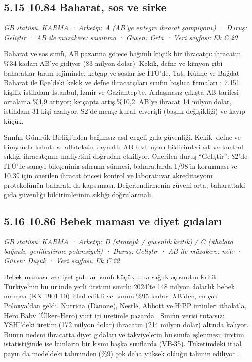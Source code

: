 \hypertarget{nace_kartlar_10-12-515-1084-baharat-sos-ve-sirke}{%
\subsection{5.15 10.84 Baharat, sos ve sirke}\label{nace_kartlar_10-12-515-1084-baharat-sos-ve-sirke}}

\emph{GB statüsü: KARMA · Arketip: A (AB'ye entegre ihracat şampiyonu) · Duruş: Geliştir · AB ile müzakere: savunma · Güven: Orta · Veri sayfası: Ek C.20}

Baharat ve sos sınıfı, AB pazarına görece bağımlı küçük bir ihracatçı: ihracatın \%34 kadarı AB'ye gidiyor (83 milyon dolar). Kekik, defne ve kimyon gibi baharatlar tarım rejiminde, ketçap ve soslar ise İTÜ'de. Tat, Kühne ve Bağdat Baharat ile Ege'deki kekik ve defne ihracatçıları sınıfın başlıca firmaları \etiketH{}; 7.151 kişilik istihdam İstanbul, İzmir ve Gaziantep'te. Anlaşmasız çıkışta AB tarifesi ortalama \%4,9 artıyor; ketçapta artış \%10,2. AB'ye ihracat 14 milyon dolar, istihdam 31 kişi azalıyor. S2'de menşe kuralı elverişli (başlık değişikliği) ve kayıp küçük.

Sınıfın Gümrük Birliği'nden bağımsız asıl engeli gıda güvenliği. Kekik, defne ve kimyonda kalıntı ve aflatoksin kaynaklı AB hızlı uyarı bildirimleri sık \etiketD{} ve kontrol sıklığı ihracatçının maliyetini doğrudan etkiliyor. Önerilen duruş ``Geliştir'': S2'de İTÜ'de sanayi bileşeninin sıfırının sürmesi, baharatlarda 1/98'in korunması ve 10.39 için önerilen ihracat öncesi kontrol ve laboratuvar akreditasyonu protokolünün baharatı da kapsaması. Değerlendirmenin güveni orta; baharattaki gıda güvenliği bildirimlerinin sıklığı doğrulanmalı.

\hypertarget{nace_kartlar_10-12-516-1086-bebek-mamasux131-ve-diyet-gux131dalarux131}{%
\subsection{5.16 10.86 Bebek maması ve diyet gıdaları}\label{nace_kartlar_10-12-516-1086-bebek-mamasux131-ve-diyet-gux131dalarux131}}

\emph{GB statüsü: KARMA · Arketip: D (stratejik / güvenlik kritik) / C (ithalata bağımlı, yerlileştirme potansiyeli) · Duruş: Geliştir · AB ile müzakere: nötr · Güven: Düşük · Veri sayfası: Ek C.22}

Bebek maması ve diyet gıdaları sınıfı küçük ama sağlık açısından kritik. Türkiye'nin bu üründe yerli üretimi sınırlı; 2024'te 148 milyon dolarlık bebek maması (KN 1901 10) ithal edildi ve bunun \%95 kadarı AB'den, en çok Polonya'dan geldi. Nutricia (Danone), Nestlé, Abbott ve HiPP ürünleri ithalatla, Hero Baby (Ülker--Hero) yurt içi üretimle pazarda \etiketH{}. Sınıfın verisi tutarsız: YSHİ'deki üretim (172 milyon dolar) ihracatın (214 milyon dolar) altında kalıyor. Bunun nedeni ihracatta diyet gıdaları ve takviyelerin bu sınıfa eşlenmesi; üretim istatistiğinde ise bunların bir kısmı başka sınıflarda (VB-35). Tüketimdeki ithal payın da modeldeki tahminden (\%9) çok daha yüksek olduğu tahmin ediliyor \etiketD{}.

